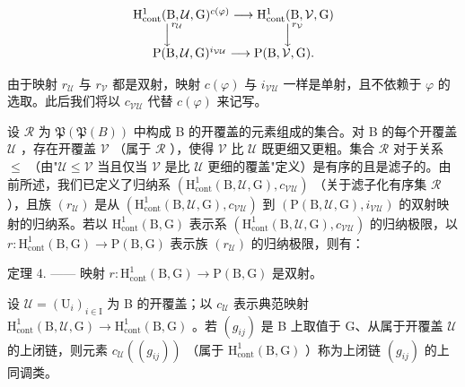 \[
\begin{array}{c} \mathrm{H} _ {\mathrm{cont}} ^ {1} (\mathrm{B}, \mathcal {U}, \mathrm{G}) ^ {c (\varphi)} \longrightarrow \mathrm{H} _ {\mathrm{cont}} ^ {1} (\mathrm{B}, \mathcal {V}, \mathrm{G}) \\ \Big \downarrow^ {r _ {\mathcal {U}}} \qquad \qquad \qquad \qquad \Big \downarrow^ {r _ {\mathcal {V}}} \\ \mathrm{P} (\mathrm{B}, \mathcal {U}, \mathrm{G}) ^ {i _ {\mathcal {V} \mathcal {U}}} \longrightarrow \mathrm{P} (\mathrm{B}, \mathcal {V}, \mathrm{G}). \end{array}
\]

由于映射 \(r_{\mathcal{U}}\) 与 \(r_{\mathcal{V}}\) 都是双射，映射 \(c(\varphi)\) 与 \(i_{\mathcal{V}\mathcal{U}}\) 一样是单射，且不依赖于 \(\varphi\) 的选取。此后我们将以 \(c_{\mathcal{V}\mathcal{U}}\) 代替 \(c(\varphi)\) 来记写。

设 \(\mathcal{R}\) 为 \(\mathfrak{P}(\mathfrak{P}(B))\) 中构成 B 的开覆盖的元素组成的集合。对 B 的每个开覆盖 \(\mathcal{U}\) ，存在开覆盖 \(\mathcal{V}\) （属于 \(\mathcal{R}\) ），使得 \(\mathcal{V}\) 比 \(\mathcal{U}\) 既更细又更粗。集合 \(\mathcal{R}\) 对于关系 \(\leqslant\) （由"\(\mathcal{U} \leqslant \mathcal{V}\) 当且仅当 \(\mathcal{V}\) 是比 \(\mathcal{U}\) 更细的覆盖"定义）是有序的且是滤子的。由前所述，我们已定义了归纳系 \((\mathrm{H}_{\mathrm{cont}}^{1}(\mathrm{B},\mathcal{U},\mathrm{G}),c_{\mathcal{V}\mathcal{U}})\) （关于滤子化有序集 \(\mathcal{R}\) ），且族 \((r_{\mathcal{U}})\) 是从 \((\mathrm{H}_{\mathrm{cont}}^{1}(\mathrm{B},\mathcal{U},\mathrm{G}),c_{\mathcal{V}\mathcal{U}})\) 到 \((\mathrm{P}(\mathrm{B},\mathcal{U},\mathrm{G}),i_{\mathcal{V}\mathcal{U}})\) 的双射映射的归纳系。若以 \(\mathrm{H}_{\mathrm{cont}}^{1}(\mathrm{B},\mathrm{G})\) 表示系 \((\mathrm{H}_{\mathrm{cont}}^{1}(\mathrm{B},\mathcal{U},\mathrm{G}),c_{\mathcal{V}\mathcal{U}})\) 的归纳极限，以 \(r\colon \mathrm{H}_{\mathrm{cont}}^{1}(\mathrm{B},\mathrm{G})\to \mathrm{P}(\mathrm{B},\mathrm{G})\) 表示族 \((r_{\mathcal{U}})\) 的归纳极限，则有：

定理 4. —— 映射 \(r\colon \mathrm{H}_{\mathrm{cont}}^{1}(\mathrm{B},\mathrm{G})\to \mathrm{P}(\mathrm{B},\mathrm{G})\) 是双射。

设 \(\mathcal{U} = (\mathrm{U}_i)_{i\in \mathrm{I}}\) 为 B 的开覆盖；以 \(c_{\mathcal{U}}\) 表示典范映射 \(\mathrm{H}_{\mathrm{cont}}^{1}(\mathrm{B},\mathcal{U},\mathrm{G})\to \mathrm{H}_{\mathrm{cont}}^{1}(\mathrm{B},\mathrm{G})\) 。若 \((g_{ij})\) 是 B 上取值于 G、从属于开覆盖 \(\mathcal{U}\) 的上闭链，则元素 \(c_{\mathcal{U}}((g_{ij}))\) （属于 \(\mathrm{H}_{\mathrm{cont}}^{1}(\mathrm{B},\mathrm{G})\) ）称为上闭链 \((g_{ij})\) 的上同调类。

